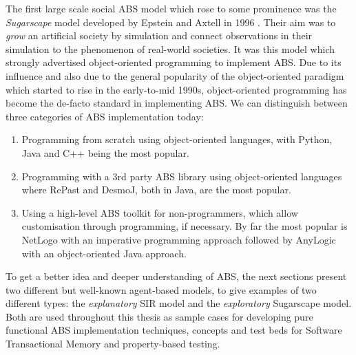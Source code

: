 The first large scale social ABS model which rose to some prominence was the \textit{Sugarscape} model developed by Epstein and Axtell in 1996 \cite{epstein_growing_1996}. Their aim was to \textit{grow} an artificial society by simulation and connect observations in their simulation to the phenomenon of real-world societies. It was this model which strongly advertised object-oriented programming to implement ABS. Due to its influence and also due to the general popularity of the object-oriented paradigm which started to rise in the early-to-mid 1990s, object-oriented programming has become the de-facto standard in implementing ABS. We can distinguish between three categories of ABS implementation today: %
\begin{enumerate}
	\item Programming from scratch using object-oriented languages, with Python, Java and C++ being the most popular.
	\item Programming with a 3rd party ABS library using object-oriented languages where RePast and DesmoJ, both in Java, are the most popular.
	\item Using a high-level ABS toolkit for non-programmers, which allow customisation through programming, if necessary. By far the most popular is NetLogo with an imperative programming approach followed by AnyLogic with an object-oriented Java approach.
\end{enumerate}

To get a better idea and deeper understanding of ABS, the next sections present two different but well-known agent-based models, to give examples of two different types: the \textit{explanatory} SIR model and the \textit{exploratory} Sugarscape model. Both are used throughout this thesis as sample cases for developing pure functional ABS implementation techniques, concepts and test beds for Software Transactional Memory and property-based testing.



